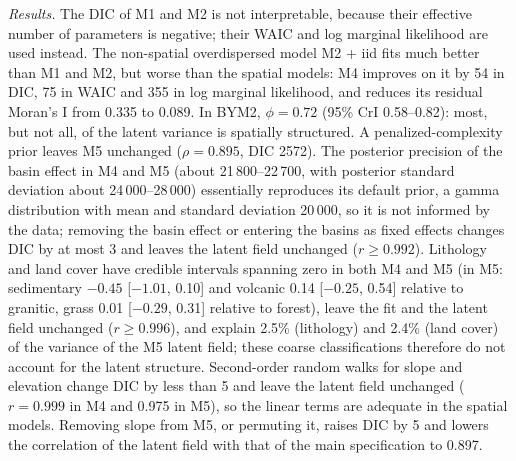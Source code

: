 \documentclass[journal abbreviation, manuscript]{copernicus}
\begin{document}
\textit{Results.} The DIC of M1 and M2 is not interpretable, because their effective number of parameters is negative; their WAIC and log marginal likelihood are used instead. The non-spatial overdispersed model M2 + iid fits much better than M1 and M2, but worse than the spatial models: M4 improves on it by 54 in DIC, 75 in WAIC and 355 in log marginal likelihood, and reduces its residual Moran's I from 0.335 to 0.089. In BYM2, $\phi = 0.72$ (95\% CrI 0.58--0.82): most, but not all, of the latent variance is spatially structured. A penalized-complexity prior leaves M5 unchanged ($\rho = 0.895$, DIC 2572). The posterior precision of the basin effect in M4 and M5 (about 21\,800--22\,700, with posterior standard deviation about 24\,000--28\,000) essentially reproduces its default prior, a gamma distribution with mean and standard deviation 20\,000, so it is not informed by the data; removing the basin effect or entering the basins as fixed effects changes DIC by at most 3 and leaves the latent field unchanged ($r \geq 0.992$). Lithology and land cover have credible intervals spanning zero in both M4 and M5 (in M5: sedimentary $-0.45$ [$-1.01$, 0.10] and volcanic 0.14 [$-0.25$, 0.54] relative to granitic, grass 0.01 [$-0.29$, 0.31] relative to forest), leave the fit and the latent field unchanged ($r \geq 0.996$), and explain 2.5\% (lithology) and 2.4\% (land cover) of the variance of the M5 latent field; these coarse classifications therefore do not account for the latent structure. Second-order random walks for slope and elevation change DIC by less than 5 and leave the latent field unchanged ($r = 0.999$ in M4 and 0.975 in M5), so the linear terms are adequate in the spatial models. Removing slope from M5, or permuting it, raises DIC by 5 and lowers the correlation of the latent field with that of the main specification to 0.897.
\end{document}
